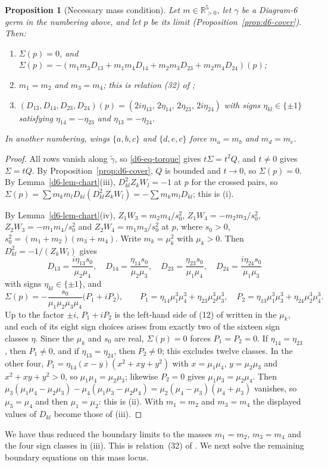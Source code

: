 \documentclass[Threeside,11pt]{article}
\newtheorem{proposition}[theorem]{Proposition}
\theoremstyle{definition}
\theoremstyle{remark}
\numberwithin{equation}{section}
\theoremstyle{remark}
\newcommand{\Rp}{\mathbb{R}_{>0}}
\newenvironment{romanlist}{\begin{enumerate}\renewcommand{\labelenumi}{(\roman{enumi})}%
  \renewcommand{\theenumi}{\roman{enumi}}}{\end{enumerate}}
\begin{document}
\begin{proposition}[Necessary mass condition]\label{prop:d6-first}
Let $m\in\Rp^5$, let $\gamma$ be a Diagram-6 germ in the numbering above, and let $p$ be its
limit (Proposition~\ref{prop:d6-cover}).  Then:
\begin{romanlist}
  \item $\Sigma(p)=0$, and $\Sigma(p)=-(m_1m_3D_{13}+m_1m_4D_{14}+m_2m_3D_{23}+m_2m_4D_{24})(p)$;
  \item $m_1=m_2$ and $m_3=m_4$; this is relation (32) of \cite[\S8.6]{AK};
  \item $(D_{13},D_{14},D_{23},D_{24})(p)=(2i\eta_{13},\,2\eta_{14},\,2\eta_{23},\,2i\eta_{24})$
  with signs $\eta_{kl}\in\{\pm1\}$ satisfying $\eta_{14}=-\eta_{23}$ and $\eta_{13}=-\eta_{24}$.
\end{romanlist}
In another numbering, wings $\{a,b,c\}$ and $\{d,e,c\}$ force $m_a=m_b$ and $m_d=m_e$.
\end{proposition}

\begin{proof}
All rows vanish along $\tilde\gamma$, so \eqref{d6-eq-torque} gives $t\Sigma=t^2Q$, and $t\ne0$
gives $\Sigma=tQ$.  By Proposition~\ref{prop:d6-cover}, $Q$ is bounded and $t\to0$, so
$\Sigma(p)=0$.  By Lemma~\ref{d6-lem-chart}(iii), $D_{kl}^2Z_kW_l=-1$ at $p$ for the crossed
pairs, so $\Sigma(p)=\sum m_km_lD_{kl}(D_{kl}^2Z_kW_l)=-\sum m_km_lD_{kl}$; this is (i).

By Lemma~\ref{d6-lem-chart}(iv), $Z_1W_3=m_2m_4/s_0^2$, $Z_1W_4=-m_2m_3/s_0^2$,
$Z_2W_3=-m_1m_4/s_0^2$ and $Z_2W_4=m_1m_3/s_0^2$ at $p$, where $s_0>0$,
$s_0^2=(m_1+m_2)(m_3+m_4)$.  Write $m_k=\mu_k^2$ with $\mu_k>0$.  Then $D_{kl}^2=-1/(Z_kW_l)$ gives
\[
  D_{13}=\frac{i\eta_{13}s_0}{\mu_2\mu_4},\quad D_{14}=\frac{\eta_{14}s_0}{\mu_2\mu_3},\quad
  D_{23}=\frac{\eta_{23}s_0}{\mu_1\mu_4},\quad D_{24}=\frac{i\eta_{24}s_0}{\mu_1\mu_3}
\]
with signs $\eta_{kl}\in\{\pm1\}$, and
\[
  \Sigma(p)=-\frac{s_0}{\mu_1\mu_2\mu_3\mu_4}\bigl(P_1+iP_2\bigr),\qquad
  P_1=\eta_{14}\mu_1^3\mu_4^3+\eta_{23}\mu_2^3\mu_3^3,\quad
  P_2=\eta_{13}\mu_1^3\mu_3^3+\eta_{24}\mu_2^3\mu_4^3.
\]
Up to the factor $\pm i$, $P_1+iP_2$ is the left-hand side of (12) of
\cite[\S5.1]{AK} written in the $\mu_k$, and each of its eight sign choices arises from exactly two
of the sixteen sign classes $\eta$.
Since the $\mu_k$ and $s_0$ are real, $\Sigma(p)=0$ forces $P_1=P_2=0$.  If
$\eta_{14}=\eta_{23}$, then $P_1\ne0$, and if $\eta_{13}=\eta_{24}$, then
$P_2\ne0$; this excludes twelve classes.  In the other four,
$P_1=\eta_{14}(x-y)(x^2+xy+y^2)$ with $x=\mu_1\mu_4$, $y=\mu_2\mu_3$ and
$x^2+xy+y^2>0$, so $\mu_1\mu_4=\mu_2\mu_3$; likewise $P_2=0$ gives
$\mu_1\mu_3=\mu_2\mu_4$.  Then
$\mu_3(\mu_1\mu_4-\mu_2\mu_3)-\mu_4(\mu_1\mu_3-\mu_2\mu_4)=\mu_2(\mu_4-\mu_3)(\mu_4+\mu_3)$
vanishes, so $\mu_3=\mu_4$ and then $\mu_1=\mu_2$: this is (ii).  With $m_1=m_2$ and $m_3=m_4$
the displayed values of $D_{kl}$ become those of (iii).
\end{proof}
{
We have thus reduced the boundary limits to the masses
$m_1=m_2$, $m_3=m_4$ and the four sign classes in (iii). This is
relation~(32) of \cite[\S8.6]{AK}. We next solve the remaining boundary
equations on this mass locus.
}
\end{document}
